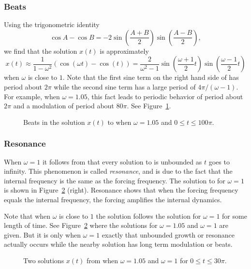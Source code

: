\documentclass{ximera}
\begin{document}
\subsubsection*{Beats}

Using the trigonometric identity
\[
\cos A - \cos B = -2\sin\left(\frac{A+B}{2}\right)
\sin\left(\frac{A-B}{2}\right),
\]
we find that the solution $x(t)$ is approximately
\begin{equation}  \label{e:x(t)reson3}
x(t) \approx  \frac{1}{1-\omega^2} (\cos(\omega t)-\cos(t))=
\frac{2}{\omega ^2-1}
\sin\left(\frac{\omega+1}{2}t\right)\sin\left(\frac{\omega-1}{2}t\right)
\end{equation}
when $\omega$ is close to $1$.  Note that the first sine term on the right hand
side of  has period about $2\pi$ while the second sine term 
has a large period of $4\pi/(\omega-1)$.  For example, when $\omega=1.05$, this
fact leads to periodic behavior of period about $2\pi$ and a 
modulation 
of period about $80\pi$.  See Figure~\ref{F:beats}.
\begin{figure}[htb]
           \centerline{%
           }
           \caption{Beats in the solution $x(t)$ to  
		when $\omega =1.05$ and $0\leq t\leq 100\pi$.}
           \label{F:beats}
\end{figure}  

\subsubsection*{Resonance}

When $\omega = 1$ it follows from  that every
solution to  is unbounded as $t$ goes to infinity.  This
phenomenon is called {\em resonance\/}, and is due to the fact that the
internal frequency is the same as the 
forcing frequency.  The solution
to  for $\omega=1$ is shown in Figure~\ref{F:reson} (right).
Resonance shows that when the forcing frequency equals the internal 
frequency, the forcing amplifies the internal dynamics.

Note that when $\omega$ is close to $1$ the solution follows the solution 
for $\omega =1$ for some length of time.  See Figure~\ref{F:reson} where 
the solutions for $\omega =1.05$ and $\omega =1$ are given.  But it is only 
when $\omega =1$ exactly that unbounded growth or resonance actually occurs 
while the nearby solution has long term modulation or beats.
\begin{figure}[htb]
           \centerline{%
           }
           \caption{Two solutions $x(t)$ from  when
                $\omega =1.05$ and $\omega =1$ for $0\leq t\leq 30\pi$.}
           \label{F:reson}
\end{figure}  
\end{document}
